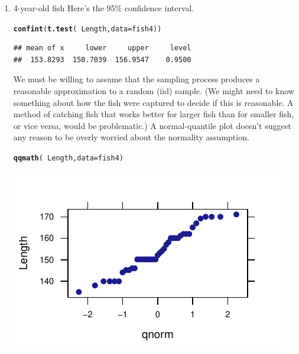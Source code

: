 \documentclass[twoside]{book}\usepackage[]{graphicx}\usepackage[]{xcolor}
\makeatletter
\def\maxwidth{ %
  \ifdim\Gin@nat@width>\linewidth
    \linewidth
  \else
    \Gin@nat@width
  \fi
}
\newcommand{\hlopt}[1]{\textcolor[rgb]{0,0,0}{#1}}%
\newcommand{\hlstd}[1]{\textcolor[rgb]{0.345,0.345,0.345}{#1}}%
\newcommand{\hlkwc}[1]{\textcolor[rgb]{0.333,0.667,0.333}{#1}}%
\newcommand{\hlkwd}[1]{\textcolor[rgb]{0.737,0.353,0.396}{\textbf{#1}}}%
\newenvironment{kframe}{%
 \def\at@end@of@kframe{}%
 \ifinner\ifhmode%
  \def\at@end@of@kframe{\end{minipage}}%
  \begin{minipage}{\columnwidth}%
 \fi\fi%
 \def\FrameCommand##1{\hskip\@totalleftmargin \hskip-\fboxsep
 \colorbox{shadecolor}{##1}\hskip-\fboxsep
     \hskip-\linewidth \hskip-\@totalleftmargin \hskip\columnwidth}%
 \MakeFramed {\advance\hsize-\width
   \@totalleftmargin\z@ \linewidth\hsize
   \@setminipage}}%
 {\par\unskip\endMakeFramed%
 \at@end@of@kframe}
\newenvironment{knitrout}{}{} %
\makeatother
\begin{document}
\begin{solution}
	\begin{enumerate}
		\item 4-year-old fish
Here's the 95\% confidence interval.
\begin{knitrout}
\color{fgcolor}\begin{kframe}
\begin{alltt}
\hlkwd{confint}\hlstd{(}\hlkwd{t.test}\hlstd{(}\hlopt{~}\hlstd{Length,} \hlkwc{data} \hlstd{= fish4))}
\end{alltt}
\begin{verbatim}
## mean of x     lower     upper     level 
##  153.8293  150.7039  156.9547    0.9500
\end{verbatim}
\end{kframe}
\end{knitrout}
\noindent
We must be willing to assume that the sampling process produces a reasonable approximation
to a random (iid) sample.  (We might need to know something about how the fish were 
captured to decide if this is reasonable.  A method of catching fish that works better for 
larger fish than for smaller fish, or vice versa, would be problematic.)  
A normal-quantile plot doesn't suggest any reason to be overly worried about
the normality assumption.
\begin{knitrout}
\color{fgcolor}\begin{kframe}
\begin{alltt}
\hlkwd{qqmath}\hlstd{(}\hlopt{~}\hlstd{Length,} \hlkwc{data} \hlstd{= fish4)}
\end{alltt}
\end{kframe}

{\centering \includegraphics[width=\maxwidth]{figures/fig-unnamed-chunk-151-1} 

}
\end{knitrout}
\end{enumerate}
\end{solution}
\end{document}
